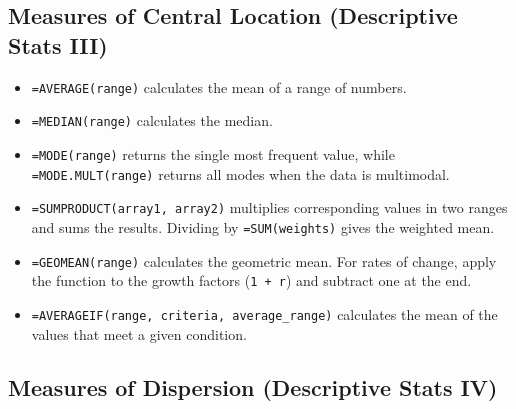 \documentclass[
  11pt,
  letterpaper,
  DIV=11,
  numbers=noendperiod,
  oneside,
  open=any]{scrreprt}
\begin{document}
\subsection*{Measures of Central Location (Descriptive Stats
III)}\label{measures-of-central-location-descriptive-stats-iii}

\begin{itemize}
\item
  \texttt{=AVERAGE(range)} calculates the mean of a range of numbers.
\item
  \texttt{=MEDIAN(range)} calculates the median.
\item
  \texttt{=MODE(range)} returns the single most frequent value, while
  \texttt{=MODE.MULT(range)} returns all modes when the data is
  multimodal.
\item
  \texttt{=SUMPRODUCT(array1,\ array2)} multiplies corresponding values
  in two ranges and sums the results. Dividing by \texttt{=SUM(weights)}
  gives the weighted mean.
\item
  \texttt{=GEOMEAN(range)} calculates the geometric mean. For rates of
  change, apply the function to the growth factors (\texttt{1\ +\ r})
  and subtract one at the end.
\item
  \texttt{=AVERAGEIF(range,\ criteria,\ average\_range)} calculates the
  mean of the values that meet a given condition.
\end{itemize}

\subsection*{Measures of Dispersion (Descriptive Stats
IV)}\label{measures-of-dispersion-descriptive-stats-iv}
\end{document}
